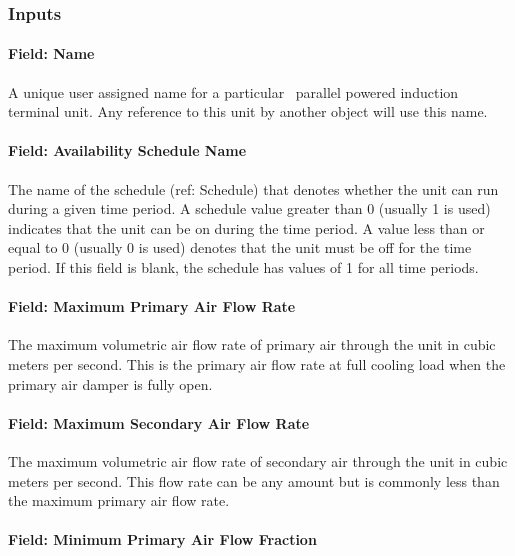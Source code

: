 \subsubsection{Inputs}\label{inputs-8-000}

\paragraph{Field: Name}\label{field-name-8-000}

A unique user assigned name for a particular~ parallel powered induction terminal unit. Any reference to this unit by another object will use this name.

\paragraph{Field: Availability Schedule Name}\label{field-availability-schedule-name-8}

The name of the schedule (ref: Schedule) that denotes whether the unit can run during a given time period. A schedule value greater than 0 (usually 1 is used) indicates that the unit can be on during the time period. A value less than or equal to 0 (usually 0 is used) denotes that the unit must be off for the time period. If this field is blank, the schedule has values of 1 for all time periods.

\paragraph{Field: Maximum Primary Air Flow Rate}\label{field-maximum-primary-air-flow-rate-1}

The maximum volumetric air flow rate of primary air through the unit in cubic meters per second. This is the primary air flow rate at full cooling load when the primary air damper is fully open.

\paragraph{Field: Maximum Secondary Air Flow Rate}\label{field-maximum-secondary-air-flow-rate}

The maximum volumetric air flow rate of secondary air through the unit in cubic meters per second. This flow rate can be any amount but is commonly less than the maximum primary air flow rate.

\paragraph{Field: Minimum Primary Air Flow Fraction}\label{field-minimum-primary-air-flow-fraction-1}

